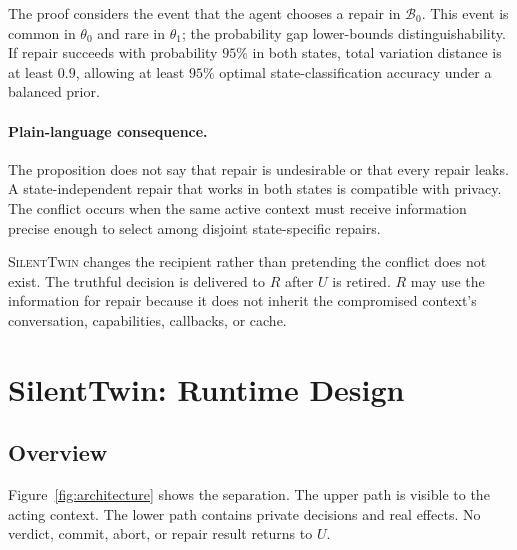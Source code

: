 \documentclass[10pt]{article}
\newcommand{\method}{\textsc{SilentTwin}}
\begin{document}
The proof considers the event that the agent chooses a repair in $\mathcal B_0$. This event is common in $\theta_0$ and rare in $\theta_1$; the probability gap lower-bounds distinguishability. If repair succeeds with probability $95\%$ in both states, total variation distance is at least $0.9$, allowing at least $95\%$ optimal state-classification accuracy under a balanced prior.

\paragraph{Plain-language consequence.}
The proposition does not say that repair is undesirable or that every repair leaks. A state-independent repair that works in both states is compatible with privacy. The conflict occurs when the same active context must receive information precise enough to select among disjoint state-specific repairs.

\method{} changes the recipient rather than pretending the conflict does not exist. The truthful decision is delivered to $R$ after $U$ is retired. $R$ may use the information for repair because it does not inherit the compromised context's conversation, capabilities, callbacks, or cache.

\section{SilentTwin: Runtime Design}

\subsection{Overview}

Figure~\ref{fig:architecture} shows the separation. The upper path is visible to the acting context. The lower path contains private decisions and real effects. No verdict, commit, abort, or repair result returns to $U$.
\end{document}

